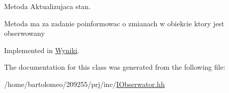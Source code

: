 Metoda Aktualizujaca stan. 

Metoda ma za zadanie poinformowac o zmianach w obiekcie ktory jest obserwowany 

Implemented in \hyperlink{class_wyniki_a4014236438f62cfd90c03de49ea38e5f}{Wyniki}.



The documentation for this class was generated from the following file\-:\begin{DoxyCompactItemize}
\item 
/home/bartolomeo/209255/prj/inc/\hyperlink{_i_obserwator_8hh}{I\-Obserwator.\-hh}\end{DoxyCompactItemize}
